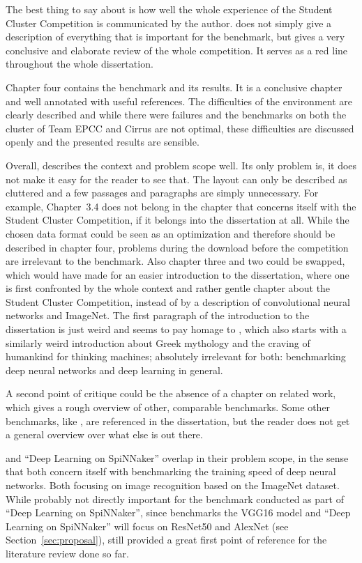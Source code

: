 \documentclass{article}
\begin{document}
The best thing to say about \citet{nita_2018} is how well
the whole experience of the Student Cluster Competition is
communicated by the author.
\citet{nita_2018} does not simply give a description of
everything that is important for the benchmark, but gives
a very conclusive and elaborate review of the whole
competition.
It serves as a red line throughout the whole dissertation.

Chapter four contains the benchmark and its results.
It is a conclusive chapter and well annotated with useful
references.
The difficulties of the environment are clearly described
and while there were failures and the benchmarks on both
the cluster of Team EPCC and Cirrus are not optimal, these
difficulties are discussed openly and the presented results
are sensible.

Overall, \citet{nita_2018} describes the context and
problem scope well.
Its only problem is, it does not make it easy for the
reader to see that.
The layout can only be described as cluttered and a few
passages and paragraphs are simply unnecessary.
For example, Chapter~3.4 does not belong in the chapter
that concerns itself with the Student Cluster Competition,
if it belongs into the dissertation at all.
While the chosen data format could be seen as an
optimization and therefore should be described in chapter
four, problems during the download before the competition
are irrelevant to the benchmark.
Also chapter three and two could be swapped, which would
have made for an easier introduction to the dissertation,
where one is first confronted by the whole context and
rather gentle chapter about the Student Cluster
Competition, instead of by a description of convolutional
neural networks and ImageNet.
The first paragraph of the introduction to the dissertation
is just weird and seems to pay homage to
\citet{goodfellow2016}, which also starts with a similarly
weird introduction about Greek mythology and the craving of
humankind for thinking machines; absolutely irrelevant for
both: benchmarking deep neural networks and deep learning
in general.

A second point of critique could be the absence of a
chapter on related work, which gives a rough overview of
other, comparable benchmarks.
Some other benchmarks, like \citet{you2017}, are referenced
in the dissertation, but the reader does not get a general
overview over what else is out there.

\citet{nita_2018} and ``Deep Learning on SpiNNaker''
overlap in their problem scope, in the sense that both
concern itself with benchmarking the training speed of
deep neural networks.
Both focusing on image recognition based on the ImageNet
dataset.
While probably not directly important for the benchmark
conducted as part of ``Deep Learning on SpiNNaker'',
since \citet{nita_2018} benchmarks the VGG16 model and
``Deep Learning on SpiNNaker'' will focus on ResNet50 and
AlexNet (see Section~\ref{sec:proposal}),
\citet{nita_2018} still provided a great first point of
reference for the literature review done so far.



\end{document}
